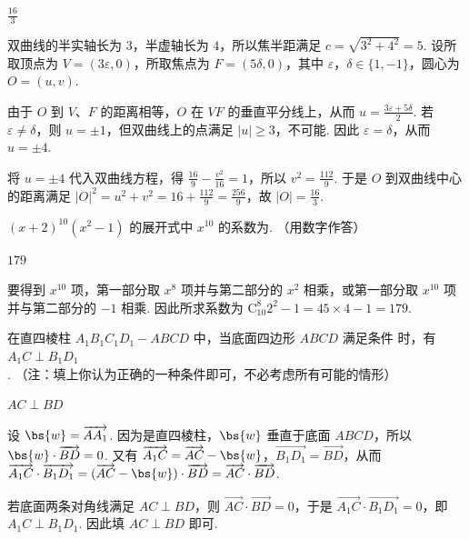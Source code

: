 \begin{answer}
\(\frac{16}{3}\)
\end{answer}

\begin{solution}
双曲线的半实轴长为 \(3\)，半虚轴长为 \(4\)，所以焦半距满足
\(c=\sqrt{3^{2}+4^{2}}=5\). 设所取顶点为 \(V=(3\varepsilon,0)\)，所取焦点为 \(F=(5\delta,0)\)，其中 \(\varepsilon\)，\(\delta\in\{1,-1\}\)，圆心为 \(O=(u,v)\).

由于 \(O\) 到 \(V\)、\(F\) 的距离相等，\(O\) 在 \(VF\) 的垂直平分线上，从而
\(u=\frac{3\varepsilon+5\delta}{2}\). 若 \(\varepsilon\neq\delta\)，则 \(u=\pm1\)，但双曲线上的点满足 \(|u|\geq3\)，不可能. 因此 \(\varepsilon=\delta\)，从而 \(u=\pm4\).

将 \(u=\pm4\) 代入双曲线方程，得
\(\frac{16}{9}-\frac{v^{2}}{16}=1\)，所以 \(v^{2}=\frac{112}{9}\). 于是
\(O\) 到双曲线中心的距离满足
\(\lvert O\rvert^{2}=u^{2}+v^{2}=16+\frac{112}{9}=\frac{256}{9}\)，故 \(\lvert O\rvert=\frac{16}{3}\).
\end{solution}

\begin{problem}
\((x + 2)^{10}(x^{2} - 1)\) 的展开式中 \(x^{10}\) 的系数为\fillinblank{}. （用数字作答）
\end{problem}

\begin{answer}
\(179\)
\end{answer}

\begin{solution}
要得到 \(x^{10}\) 项，第一部分取 \(x^{8}\) 项并与第二部分的 \(x^{2}\) 相乘，或第一部分取 \(x^{10}\) 项并与第二部分的 \(-1\) 相乘. 因此所求系数为
\(\mathrm C_{10}^{8}2^{2}-1=45\times4-1=179\).
\end{solution}

\begin{problem}
在直四棱柱 \(A_{1}B_{1}C_{1}D_{1}-ABCD\) 中，当底面四边形 \(ABCD\) 满足条件\fillinblank{} 时，有 \(A_{1}C \perp B_{1}D_{1}\). （注：填上你认为正确的一种条件即可，不必考虑所有可能的情形）
\end{problem}

\begin{answer}
\(AC\perp BD\)
\end{answer}

\begin{solution}
设 \(\bs{w}=\overrightarrow{AA_{1}}\). 因为是直四棱柱，\(\bs{w}\) 垂直于底面 \(ABCD\)，所以 \(\bs{w}\cdot\overrightarrow{BD}=0\). 又有
\(\overrightarrow{A_{1}C}=\overrightarrow{AC}-\bs{w}\)，\(\overrightarrow{B_{1}D_{1}}=\overrightarrow{BD}\)，从而
\(\overrightarrow{A_{1}C}\cdot\overrightarrow{B_{1}D_{1}}=(\overrightarrow{AC}-\bs{w})\cdot\overrightarrow{BD}=\overrightarrow{AC}\cdot\overrightarrow{BD}\).

若底面两条对角线满足 \(AC\perp BD\)，则 \(\overrightarrow{AC}\cdot\overrightarrow{BD}=0\)，于是
\(\overrightarrow{A_{1}C}\cdot\overrightarrow{B_{1}D_{1}}=0\)，即 \(A_{1}C\perp B_{1}D_{1}\). 因此填 \(AC\perp BD\) 即可.
\end{solution}

